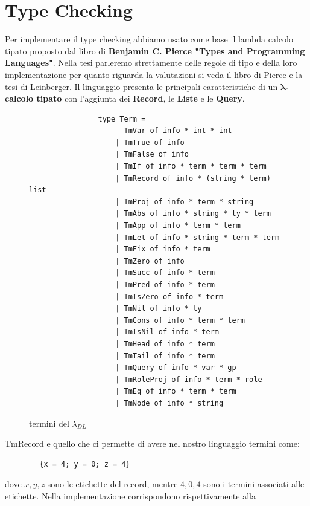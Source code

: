 \section{Type Checking}
        Per implementare il type checking abbiamo usato come base il lambda calcolo tipato proposto dal libro di \textbf{Benjamin C. Pierce "Types and Programming Languages"}.
        Nella tesi parleremo strettamente delle regole di tipo e della loro implementazione per quanto riguarda la valutazioni si veda il libro di Pierce e la tesi di Leinberger.
        Il linguaggio presenta le principali caratteristiche di un \textbf{ $\boldsymbol{\lambda}$-calcolo tipato} con l'aggiunta dei \textbf{Record}, le \textbf{Liste} e le \textbf{Query}.
        \begin{figure}[h] 
            \begin{verbatim}
                type Term =
                      TmVar of info * int * int 
                    | TmTrue of info 
                    | TmFalse of info 
                    | TmIf of info * term * term * term 
                    | TmRecord of info * (string * term) list 
                    | TmProj of info * term * string 
                    | TmAbs of info * string * ty * term 
                    | TmApp of info * term * term 
                    | TmLet of info * string * term * term 
                    | TmFix of info * term 
                    | TmZero of info 
                    | TmSucc of info * term 
                    | TmPred of info * term 
                    | TmIsZero of info * term 
                    | TmNil of info * ty 
                    | TmCons of info * term * term 
                    | TmIsNil of info * term 
                    | TmHead of info * term 
                    | TmTail of info * term  
                    | TmQuery of info * var * gp
                    | TmRoleProj of info * term * role
                    | TmEq of info * term * term
                    | TmNode of info * string
            \end{verbatim}
        \caption{termini del $\lambda_{DL}$}
        \end{figure}
        TmRecord e quello che ci permette di avere nel nostro linguaggio termini come:
        \begin{verbatim}
        {x = 4; y = 0; z = 4}
        \end{verbatim}
        dove $x, y, z$ sono le etichette del record, mentre $4, 0, 4$ sono i termini associati alle etichette. Nella implementazione corrispondono rispettivamente alla
